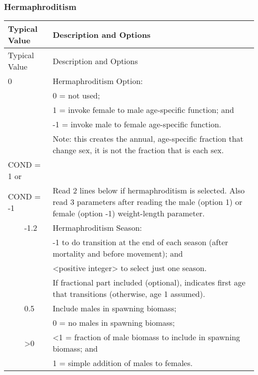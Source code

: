 \pagebreak
\subsubsection{Hermaphroditism}

\begin{longtable}{p{0.5cm} p{2cm} p{13cm}}
	\hline	
	\multicolumn{2}{l}{Typical Value} & Description and Options \Tstrut\Bstrut\\
	\hline
	\endfirsthead

	\hline
	\multicolumn{2}{l}{Typical Value} & Description and Options \Tstrut\Bstrut\\
	\hline
	\endhead
	\hline

	\endfoot
	
	\endlastfoot

	0 & & Hermaphroditism Option: \Tstrut\\
	 &  & 0 = not used; \\
	 &  & 1 = invoke female to male age-specific function; and \\
	 &  & -1 = invoke male to female age-specific function. \\
	 &  & Note: this creates the annual, age-specific fraction that change sex, it is not the fraction that is each sex. \Bstrut\\
	\hline

	\multicolumn{2}{l}{COND = 1 or} \Tstrut & \\
	\multicolumn{2}{l}{COND = -1} & Read 2 lines below if hermaphroditism is selected. Also read 3 parameters after reading the male (option 1) or female (option -1) weight-length parameter. \Bstrut\\
	& -1.2 & Hermaphroditism Season: \\
	&    & -1 to do transition at the end of each season (after mortality and before movement); and \\
	&    & <positive integer> to select just one season. \\
    &	 & If fractional part included (optional), indicates first age that transitions (otherwise, age 1 assumed). \\
	& 0.5 & Include males in spawning biomass; \\
	&    & 0 = no males in spawning biomass; \\
	& >0 & <1 = fraction of male biomass to include in spawning biomass; and \\
	&    & 1 = simple addition of males to females. \Bstrut\\
	\hline
\end{longtable}
\vspace*{-\baselineskip}

